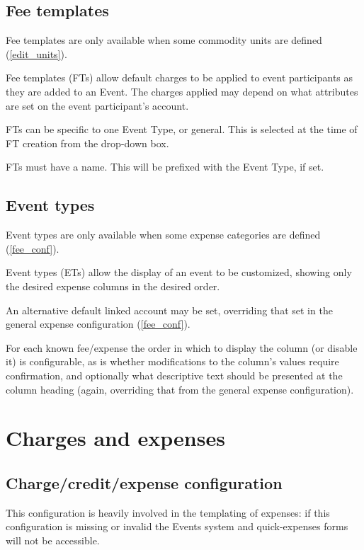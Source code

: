 \documentclass{report}
\begin{document}
\subsection{Fee templates}\label{fts}
Fee templates are only available when some commodity units are defined (\autoref{edit_units}).

Fee templates (FTs) allow default charges to be applied to event participants as they are added to an Event.  The charges applied may depend on what attributes are set on the event participant's account.

FTs can be specific to one Event Type, or general.  This is selected at the time of FT creation from the drop-down box.

FTs must have a name.  This will be prefixed with the Event Type, if set.

\subsection{Event types}

Event types are only available when some expense categories are defined (\autoref{fee_conf}).

Event types (ETs) allow the display of an event to be customized, showing only the desired expense columns in the desired order.

An alternative default linked account may be set, overriding that set in the general expense configuration (\autoref{fee_conf}).

For each known fee/expense the order in which to display the column (or disable it) is configurable, as is whether modifications to the column's values require confirmation, and optionally what descriptive text should be presented at the column heading (again, overriding that from the general expense configuration).

\section{Charges and expenses}

\subsection{Charge/credit/expense configuration}

This configuration is heavily involved in the templating of expenses: if this configuration is missing or invalid the Events system and quick-expenses forms will not be accessible.
\end{document}
